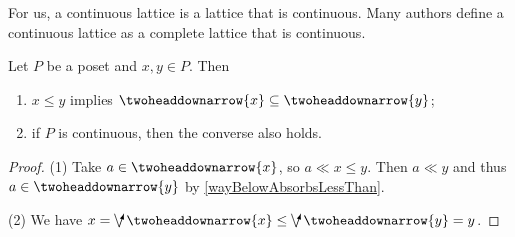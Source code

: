 For us, a continuous lattice is a lattice that is continuous. Many authors define a continuous lattice as a complete lattice that is continuous.

\begin{lemma} \label{downsetEmbeddingContinuousPosets}
Let $P$ be a poset and $x,y\in P$. Then 
\begin{enumerate}
\item $x\leq y$ implies $\ddownset \{x\} \subseteq \ddownset \{y\}$;
\item if $P$ is continuous, then the converse also holds.
\end{enumerate}
\end{lemma}
\begin{proof}
(1) Take $a\in \ddownset\{x\}$, so $a \ll x \leq y$. Then $a \ll y$ and thus $a\in \ddownset\{y\}$ by \ref{wayBelowAbsorbsLessThan}.

(2) We have $x = \dirvee \ddownset\{x\} \leq \dirvee \ddownset\{y\} = y$.
\end{proof}

